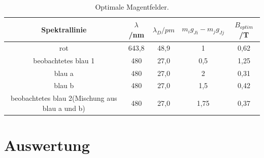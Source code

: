 \begin{table}
    \centering
    \caption{Optimale Magentfelder.}
    \label{tab:A}
    \begin{tabular}{c S[table-format=2.1] S[table-format=6.0] S S}
      \toprule
       {Spektrallinie} & {$\lambda$}/nm &{$\lambda_{\si{D}}/\si{pm}$}& {$m_i g_{Ji} - m_j g_{Jj}$} & {$B_{\si{optim}}$/T}\\
      \midrule
      \midrule
        rot                                            & 643,8  &  48,9 & 1   & 0,62\\
        beobachtetes blau 1                            & 480    &  27,0 & 0,5 & 1,25\\
        blau a                                         & 480    &  27,0 & 2   & 0,31\\
        blau b                                         & 480    &  27,0 & 1,5 & 0,42\\
        beobachtetes blau 2(Mischung aus blau a und b) & 480    &  27,0 & 1,75& 0,37\\
      \bottomrule
    \end{tabular}
\end{table}
\FloatBarrier




\section{Auswertung}
\label{sec:Auswertung}






